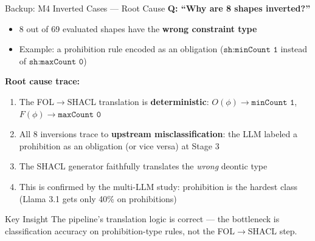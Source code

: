 \documentclass[aspectratio=169, 10pt]{beamer}
\begin{document}
\begin{frame}{Backup: M4 Inverted Cases --- Root Cause}
    \textbf{Q: ``Why are 8 shapes inverted?''}

    \vspace{0.2cm}
    \begin{itemize}
        \item 8 out of 69 evaluated shapes have the \textbf{wrong constraint type}
        \item Example: a prohibition rule encoded as an obligation ($\texttt{sh:minCount 1}$ instead of $\texttt{sh:maxCount 0}$)
    \end{itemize}

    \vspace{0.3cm}
    \textbf{Root cause trace:}
    \begin{enumerate}
        \item The FOL$\rightarrow$SHACL translation is \textbf{deterministic}: $O(\phi) \rightarrow \texttt{minCount 1}$, $F(\phi) \rightarrow \texttt{maxCount 0}$
        \item All 8 inversions trace to \textbf{upstream misclassification}: the LLM labeled a prohibition as an obligation (or vice versa) at Stage 3
        \item The SHACL generator faithfully translates the \textit{wrong} deontic type
        \item This is confirmed by the multi-LLM study: prohibition is the hardest class (Llama 3.1 gets only 40\% on prohibitions)
    \end{enumerate}

    \vspace{0.2cm}
    \begin{alertblock}{Key Insight}
        The pipeline's translation logic is correct --- the bottleneck is classification accuracy on prohibition-type rules, not the FOL$\rightarrow$SHACL step.
    \end{alertblock}
\end{frame}
\end{document}
